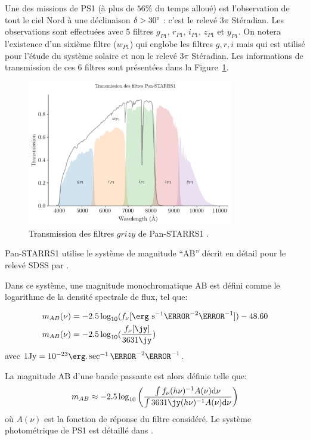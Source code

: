 \documentclass[../main/main.tex]{subfiles}
\begin{document}
Une des missions de PS1 (à plus de $56\%$ du temps alloué) est l'observation de tout le ciel Nord à une déclinaison $\delta>30\degree$ :
c'est le
relevé $3\pi$ Stéradian. Les observations sont effectuées avec 5 filtres
$g_{P1}$, $r_{P1}$, $i_{P1}$, $z_{P1}$ et $y_{P1}$. On notera
l'existence d'un  sixième
filtre ($w_{P1}$) qui
englobe les filtres $g,r,i$ mais qui est utilisé pour l'étude du système
solaire et non le relevé $3\pi$ Stéradian. Les informations
de transmission de ces $6$ filtres sont présentées dans la Figure~\ref{fig:ps1filters}.

\begin{figure}
  \centering
  \includegraphics[width=0.8\textwidth]{../figures/05_sedfit/ps1filters.png}
  \caption[Transmission des filtres Pan-STARRS1]{Transmission des
    filtres $grizy$ de Pan-STARRS1 \citep{Tonry2012}.}
  \label{fig:ps1filters}
\end{figure}


Pan-STARRS1 utilise le système de magnitude ``AB'' \citep{Oke1983}
décrit en détail pour le relevé SDSS \citep{YorkSDSS2000} par
\citet{Fukugita1996}.

Dans ce système, une magnitude monochromatique AB est défini comme le
logarithme de la densité spectrale de flux, tel que:

\begin{align}
  \label{eq:abmag}
  m_{AB}(\nu)&= -2.5\log_{10}(f_{\nu}[\erg\ \text{s}^{-1}\cm^{-2}\Hz^{-1}]) -
  48.60\\
  m_{AB}(\nu)&= -2.5\log_{10}(\frac{f_{\nu}[\jy]}{3631\jy})
\end{align}
avec $1\text{Jy} = 10^{-23}\erg.\sec^{-1}\cm^{-2}\Hz^{-1}$.

La magnitude AB d'une bande passante est alors définie telle que:
\begin{equation}
  \label{eq:abmagbp}
  m_{AB}\approx-2.5\log_{10}\left(\frac{\int
      f_{\nu}(h\nu)^{-1}A(\nu)\d\nu}{\int 3631\jy(h\nu)^{-1}A(\nu)\d\nu}   \right)
\end{equation}
où $A(\nu)$ est la fonction de réponse du filtre considéré. Le système
photométrique de PS1 est détaillé dans \citet{Tonry2012}.
\end{document}
